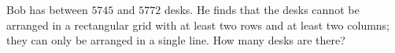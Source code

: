 Bob has between $5745$ and $5772$ desks. He finds that the desks cannot be arranged in a rectangular grid with at least two rows and at least two columns; they can only be arranged in a single line. How many desks are there?
